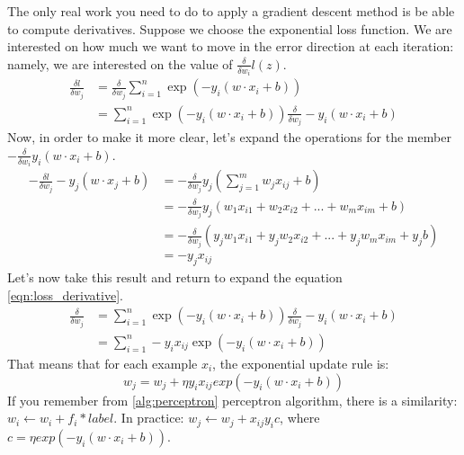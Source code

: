 The only real work you need to do to apply a gradient descent method is be able to compute derivatives. Suppose we choose the exponential loss function. We are interested on how much we want to move in the error direction at each iteration: namely, we are interested on the value of \(\frac \delta {\delta w_i} l(z)\).
\begin{align}
    \label{eqn:loss_derivative}
    \frac {\delta l} {\delta w_j} &= \frac \delta {\delta w_j} \sum_{i=1}^n \exp (-y_i (w \cdot x_i + b)) \\
    &= \sum_{i=1}^n \exp (-y_i (w \cdot x_i + b)) \frac \delta {\delta w_j} -y_i (w \cdot x_i + b)
\end{align}
Now, in order to make it more clear, let's expand the operations for the member \(- \frac \delta {\delta w_i} y_i(w \cdot x_i + b)\).
\begin{align*}
    - \frac {\delta l} {\delta w_j} -y_j (w \cdot x_j + b) &= - \frac \delta {\delta w_j} y_j (\sum_{j=1}^m w_j x_{ij} + b)\\
    &= -\frac \delta {\delta w_j} y_j (w_1 x_{i1} + w_2 x_{i2} + ... + w_m x_{im} + b) \\
    &= -\frac \delta {\delta w_j} (y_j w_1 x_{i1} + y_j w_2 x_{i2} + ... + y_j w_m x_{im} + y_j b) \\
    &= -y_j x_{ij}
\end{align*}
Let's now take this result and return to expand the equation \ref{eqn:loss_derivative}.
\begin{align}
    \frac \delta {\delta w_j} &= \sum_{i=1}^n \exp (-y_i (w \cdot x_i + b)) \frac \delta {\delta w_j} -y_i (w \cdot x_i + b) \\
    &= \sum_{i=1}^n -y_i x_{ij} \exp (-y_i (w \cdot x_i + b))
\end{align}
That means that for each example \(x_i\), the exponential update rule is:
\begin{equation}
    w_j = w_j + \eta y_i x_{ij} exp(-y_i (w \cdot x_i + b))
\end{equation}
If you remember from \ref{alg:perceptron} perceptron algorithm, there is a similarity: \(w_i \gets w_i + f_i*label\). In practice: \(w_j \gets w_j + x_{ij} y_i c\), where \(c = \eta exp(-y_i (w \cdot x_i + b))\).